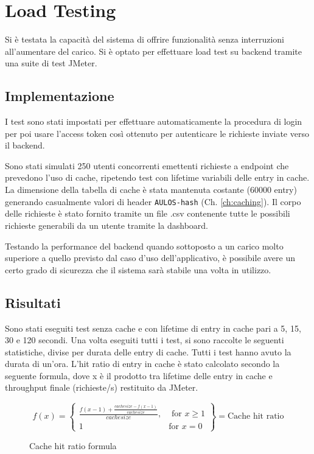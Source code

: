 \chapter{Load Testing}
\label{ch:stresstesting}
Si è testata la capacità del sistema di offrire funzionalità senza interruzioni all'aumentare del carico. 
Si è optato per effettuare load test su backend tramite una suite di test JMeter. \cite{JMETER}

\section{Implementazione}

I test sono stati impostati per effettuare automaticamente la procedura di login per poi usare l'access token così ottenuto per autenticare le richieste inviate verso il backend.

Sono stati simulati 250 utenti concorrenti emettenti richieste a endpoint che prevedono l'uso di cache, ripetendo test con lifetime variabili delle entry in cache.
La dimensione della tabella di cache è stata mantenuta costante (60000 entry) generando casualmente valori di header \verb|AULOS-hash| (Ch. \ref{ch:caching}).
Il corpo delle richieste è stato fornito tramite un file .csv contenente tutte le possibili richieste generabili da un utente tramite la dashboard.

Testando la performance del backend quando sottoposto a un carico molto superiore a quello previsto dal caso d'uso dell'applicativo, è possibile avere un certo grado di sicurezza che il sistema sarà stabile una volta in utilizzo.



\section{Risultati}
Sono stati eseguiti test senza cache e con lifetime di entry in cache pari a 5, 15, 30 e 120 secondi. 
Una volta eseguiti tutti i test, si sono raccolte le seguenti statistiche, divise per durata delle entry di cache. Tutti i test hanno avuto la durata di un'ora.
L'hit ratio di entry in cache è stato calcolato secondo la seguente formula, dove x è il prodotto tra lifetime delle entry in cache e throughput finale (richieste/s) restituito da JMeter.
\begin{figure}[h!]

\begin{Large}




  \[
    f(x) = \left\{\begin{array}{lr}
        \frac{f(x-1)+\frac{cachesize - f(x-1)}{cachesize}}{cachesize}, & \text{ for } x\geq 1\\
        1 & \text{for } x=0
        \end{array}\right\} = \text{Cache hit ratio}
  \]
\caption{Cache hit ratio formula}
\label{fig:formula}
\end{Large}

\end{figure}

